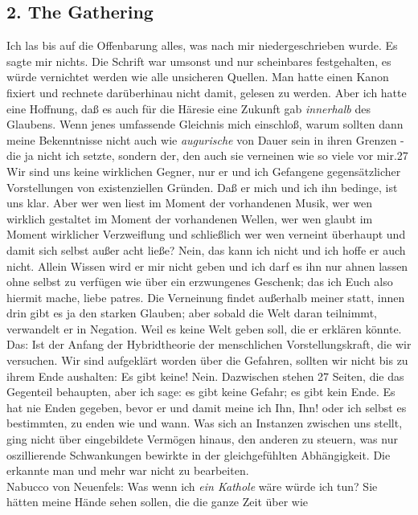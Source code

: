 \documentclass[
]{article}
\author{}
\date{\vspace{-2.5em}}
\begin{document}
\subsection{2. The Gathering}\label{the-gathering}

Ich las bis auf die Offenbarung alles, was nach mir niedergeschrieben
wurde. Es sagte mir nichts. Die Schrift war umsonst und nur scheinbares
festgehalten, es würde vernichtet werden wie alle unsicheren Quellen.
Man hatte einen Kanon fixiert und rechnete darüberhinau nicht damit,
gelesen zu werden. Aber ich hatte eine Hoffnung, daß es auch für die
Häresie eine Zukunft gab \emph{innerhalb} des Glaubens. Wenn jenes
umfassende Gleichnis mich einschloß, warum sollten dann meine
Bekenntnisse nicht auch wie \emph{augurische} von Dauer sein in ihren
Grenzen - die ja nicht ich setzte, sondern der, den auch sie verneinen
wie so viele vor mir.27 Wir sind uns keine wirklichen Gegner, nur er und
ich Gefangene gegensätzlicher Vorstellungen von existenziellen Gründen.
Daß er mich und ich ihn bedinge, ist uns klar. Aber wer wen liest im
Moment der vorhandenen Musik, wer wen wirklich gestaltet im Moment der
vorhandenen Wellen, wer wen glaubt im Moment wirklicher Verzweiflung und
schließlich wer wen verneint überhaupt und damit sich selbst außer acht
ließe? Nein, das kann ich nicht und ich hoffe er auch nicht. Allein
Wissen wird er mir nicht geben und ich darf es ihn nur ahnen lassen ohne
selbst zu verfügen wie über ein erzwungenes Geschenk; das ich Euch also
hiermit mache, liebe patres. Die Verneinung findet außerhalb meiner
statt, innen drin gibt es ja den starken Glauben; aber sobald die Welt
daran teilnimmt, verwandelt er in Negation. Weil es keine Welt geben
soll, die er erklären könnte. Das: Ist der Anfang der Hybridtheorie der
menschlichen Vorstellungskraft, die wir versuchen. Wir sind aufgeklärt
worden über die Gefahren, sollten wir nicht bis zu ihrem Ende aushalten:
Es gibt keine! Nein. Dazwischen stehen 27 Seiten, die das Gegenteil
behaupten, aber ich sage: es gibt keine Gefahr; es gibt kein Ende. Es
hat nie Enden gegeben, bevor er und damit meine ich Ihn, Ihn! oder ich
selbst es bestimmten, zu enden wie und wann. Was sich an Instanzen
zwischen uns stellt, ging nicht über eingebildete Vermögen hinaus, den
anderen zu steuern, was nur oszillierende Schwankungen bewirkte in der
gleichgefühlten Abhängigkeit. Die erkannte man und mehr war nicht zu
bearbeiten.\\
Nabucco von Neuenfels: Was wenn ich \emph{ein Kathole} wäre würde ich
tun? Sie hätten meine Hände sehen sollen, die die ganze Zeit über wie
\end{document}
